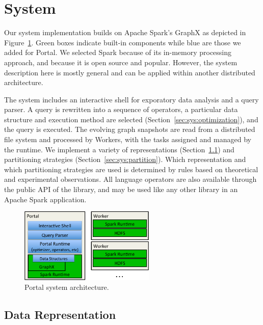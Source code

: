 \section{System}
\label{sec:sys}

Our \ql system implementation builds on Apache Spark's GraphX as
depicted in Figure~\ref{fig:arch}.  Green boxes indicate built-in
components while blue are those we added for Portal.  We selected
Spark because of its in-memory processing approach, and because it is
open source and popular.  However, the system description here is
mostly general and can be applied within another distributed
architecture.

The \ql system includes an interactive shell for exporatory data
analysis and a query parser.  A \ql query is rewritten into a sequence
of operators, a particular data structure and execution method are
selected (Section~\ref{sec:sys:optimization}), and the query is
executed.  The evolving graph snapshots are read from a distributed
file system and processed by Workers, with the tasks assigned and
managed by the runtime.    We implement a variety
of \tg representations (Section~\ref{sec:sys:datastructs}) and
partitioning strategies (Section~\ref{sec:sys:partition}).  Which
representation and which partitioning strategies are used is
determined by rules based on theoretical and experimental
observations.  All language operators are also available through the
public API of the \ql library, and may be used like any other library
in an Apache Spark application.

\begin{figure}[t!]
\begin{center}
\includegraphics[height=1.4in]{figs/architecture.pdf}
\caption{Portal system architecture.}
\label{fig:arch}
\end{center}
\vspace{-0.5cm}
\end{figure}

\subsection{Data Representation}
\label{sec:sys:datastructs}

